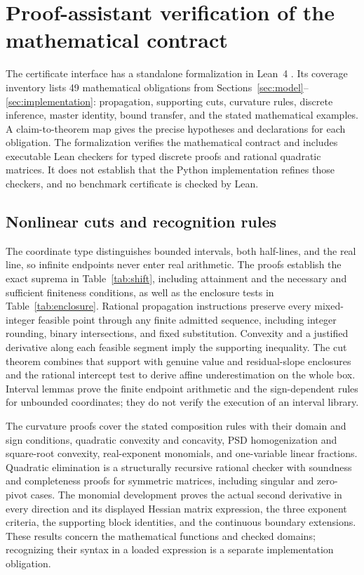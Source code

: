 \section{Proof-assistant verification of the mathematical contract}
\label{sec:formalization}
The certificate interface has a standalone formalization in Lean~4 \citep{demoura2021-lean4}. Its coverage inventory lists 49 mathematical obligations from Sections~\ref{sec:model}--\ref{sec:implementation}: propagation, supporting cuts, curvature rules, discrete inference, master identity, bound transfer, and the stated mathematical examples. A claim-to-theorem map gives the precise hypotheses and declarations for each obligation. The formalization verifies the mathematical contract and includes executable Lean checkers for typed discrete proofs and rational quadratic matrices. It does not establish that the Python implementation refines those checkers, and no benchmark certificate is checked by Lean.

\subsection{Nonlinear cuts and recognition rules}
The coordinate type distinguishes bounded intervals, both half-lines, and the real line, so infinite endpoints never enter real arithmetic. The proofs establish the exact suprema in Table~\ref{tab:shift}, including attainment and the necessary and sufficient finiteness conditions, as well as the enclosure tests in Table~\ref{tab:enclosure}. Rational propagation instructions preserve every mixed-integer feasible point through any finite admitted sequence, including integer rounding, binary intersections, and fixed substitution. Convexity and a justified derivative along each feasible segment imply the supporting inequality. The cut theorem combines that support with genuine value and residual-slope enclosures and the rational intercept test to derive affine underestimation on the whole box. Interval lemmas prove the finite endpoint arithmetic and the sign-dependent rules for unbounded coordinates; they do not verify the execution of an interval library.

The curvature proofs cover the stated composition rules with their domain and sign conditions, quadratic convexity and concavity, PSD homogenization and square-root convexity, real-exponent monomials, and one-variable linear fractions. Quadratic elimination is a structurally recursive rational checker with soundness and completeness proofs for symmetric matrices, including singular and zero-pivot cases. The monomial development proves the actual second derivative in every direction and its displayed Hessian matrix expression, the three exponent criteria, the supporting block identities, and the continuous boundary extensions. These results concern the mathematical functions and checked domains; recognizing their syntax in a loaded expression is a separate implementation obligation.

